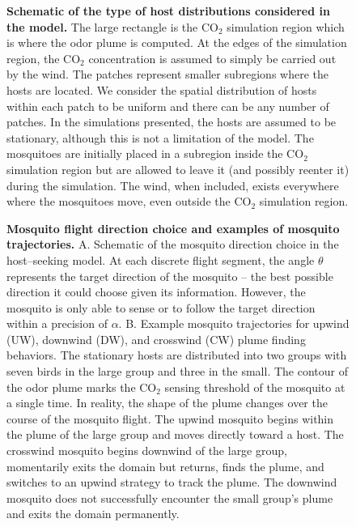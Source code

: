 \documentclass[10pt]{article}
\begin{document}
\begin{center}
\begin{figure}[!htp]
\caption{
{\bf Schematic of the type of host distributions considered in the model.}  The large rectangle is the 
CO$_2$ simulation region which is where the odor plume is computed.  At the edges of the simulation 
region, the CO$_2$ concentration is assumed to simply be carried out by the wind.  
The patches represent smaller subregions where the hosts are located.  We consider the spatial distribution 
of hosts within each patch to be uniform and there can be any number of patches. In the
simulations presented, the hosts are assumed to be stationary, although this is not a limitation of the model.
The mosquitoes are initially placed in a subregion inside the CO$_2$ simulation region but are allowed to 
leave it (and possibly reenter it) during the simulation. The wind, when included, exists everywhere where 
the mosquitoes move, even outside the CO$_2$ simulation region.}
\label{fig:setup}
\end{figure}
\end{center}


\begin{figure}[!htp]
\caption{
{\bf Mosquito flight direction choice and examples of mosquito trajectories. } A. Schematic of the mosquito direction choice in the host--seeking model. At each discrete flight segment, the angle $\theta$ represents the target direction of the mosquito -- the best possible direction it could choose given its information. However, the mosquito is only able to sense or to follow the target direction within a precision of $\alpha$.  B. Example mosquito trajectories for upwind (UW), downwind (DW), and crosswind (CW) plume finding behaviors. The stationary hosts are distributed into two groups with seven birds in the large group and three in the small. The contour of the odor plume marks the CO$_2$ sensing threshold of the mosquito at a single time. In reality, the shape of the plume changes over the course of the mosquito flight. The upwind mosquito begins within the plume of the large group and moves directly toward a host. The crosswind mosquito begins downwind of the large group, momentarily exits the domain but returns, finds the plume, and switches to an upwind strategy to track the plume. The downwind mosquito does not successfully encounter the small group's plume and exits the domain permanently.
}

\label{MosquitoGradient}
\end{figure}
\end{document}
